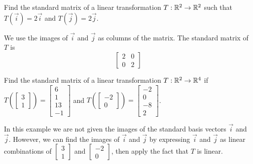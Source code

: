 \documentclass{ximera}
\begin{document}
 \begin{example}\label{ex:findmatrix}
Find the standard matrix of a linear transformation $T:\mathbb{R}^2\rightarrow \mathbb{R}^2$ such that $T(\vec{i})=2\vec{i}$ and $T(\vec{j})=2\vec{j}$.  
\begin{explanation}
We use the images of $\vec{i}$ and $\vec{j}$ as columns of the matrix.  The standard matrix of $T$ is
$$\begin{bmatrix}2&0\\0&2\end{bmatrix}$$
\end{explanation}
\end{example}
 
 \begin{example}\label{ex:transNoStBases}
 Find the standard matrix of a linear transformation $T:\mathbb{R}^2\rightarrow \mathbb{R}^4$ if $T\left(\begin{bmatrix}3\\1\end{bmatrix}\right)=\begin{bmatrix}6\\1\\13\\-1\end{bmatrix}$ and $T\left(\begin{bmatrix}-2\\0\end{bmatrix}\right)=\begin{bmatrix}-2\\0\\-8\\2\end{bmatrix}$.  
\begin{explanation}
In this example we are not given the images of the standard basis vectors $\vec{i}$ and $\vec{j}$.  However, we can find the images of $\vec{i}$ and $\vec{j}$ by expressing $\vec{i}$ and $\vec{j}$ as linear combinations of $\begin{bmatrix}3\\1\end{bmatrix}$ and $\begin{bmatrix}-2\\0\end{bmatrix}$, then apply the fact that $T$ is linear.


\end{explanation}
\end{example}
\end{document}
